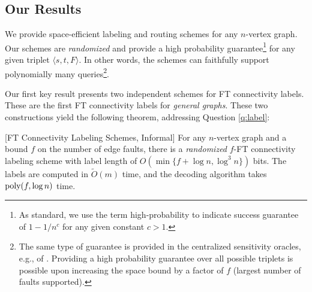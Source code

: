 \subsection{Our Results}
We provide space-efficient labeling and routing schemes for any $n$-vertex graph. Our schemes are \emph{randomized} and provide a high probability guarantee\footnote{As standard, we use the term high-probability to indicate success guarantee of $1-1/n^c$ for any given constant $c>1$.} for any given triplet $\langle s, t, F\rangle$. In other words, the schemes can faithfully support polynomially many queries\footnote{The same type of guarantee is provided in the centralized sensitivity oracles, e.g., of \cite{DuanConnectivitySODA17}. Providing a high probability guarantee over all possible triplets is possible upon increasing the space bound by a factor of $f$ (largest number of faults supported).}. 

Our first key result presents two independent schemes for FT connectivity labels. These are the first FT connectivity labels for \emph{general graphs}.
These two constructions yield the following theorem, addressing Question \ref{q:label}: 

\begin{theorem}\label{thm:conn-labels}[FT Connectivity Labeling Schemes, Informal]
For any $n$-vertex graph and a bound $f$ on the number of edge faults, there is a \emph{randomized} $f$-FT connectivity labeling scheme with label length of $O(\min\{f+\log n, \log^3 n\})$ bits. The labels are computed in $\widetilde{O}(m)$ time, and the decoding algorithm takes $\operatorname{\text{{\rm poly}}}(f,\log n)$ time. 
\end{theorem}

